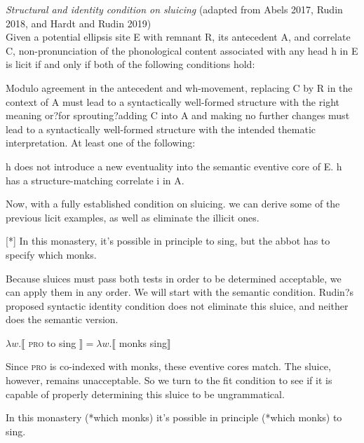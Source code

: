 \documentclass{turabian-researchpaper}
\begin{document}
\begin{exe}
\ex\label{idcondonsluicing2} \textit{Structural and identity condition on sluicing} (adapted from Abels 2017, Rudin 2018, and Hardt and Rudin 2019) \\
Given a potential ellipsis site E with remnant R, its antecedent A, and correlate C, non-pronunciation of the phonological content associated with any head h in E is licit if and only if both of the following conditions hold: 
\begin{xlist}
\ex\label{fit} Modulo agreement in the antecedent and wh-movement, replacing C by R in the context of A must lead to a syntactically well-formed structure with the right meaning or?for sprouting?adding C into A and making no further changes must lead to a syntactically well-formed structure with the intended thematic interpretation. 
\ex\label{semanticcond} At least one of the following: 
\begin{xlist}
\ex h does not introduce a new eventuality into the semantic eventive core of E.
\ex h has a structure-matching correlate i in A.
\end{xlist}
\end{xlist}
\end{exe}

Now, with a fully established condition on sluicing. we can derive some of the previous licit examples, as well as eliminate the illicit ones.  

\begin{exe}
[*] {In this monastery, it's possible in principle to sing, but the abbot has to specify which monks. }
\end{exe}

Because sluices must pass both tests in order to be determined acceptable, we can apply them in any order. We will start with the semantic condition. Rudin?s proposed syntactic identity condition does not eliminate this sluice, and neither does the semantic version. 

\begin{exe}
\ex\label{monksderiv} $\lambda w.\llbracket$ \textsc{pro} to sing $\rrbracket =  \lambda w.\llbracket$ monks sing$\rrbracket$ 
\end{exe}

Since \textsc{pro} is co-indexed with monks, these eventive cores match. The sluice, however, remains unacceptable. So we turn to the fit condition to see if it is capable of properly determining this sluice to be ungrammatical.

\begin{exe}
\ex\label{monksbadsprout3} In this monastery (*which monks) it's possible in principle (*which monks) to sing. 
\end{exe}
\end{document}
